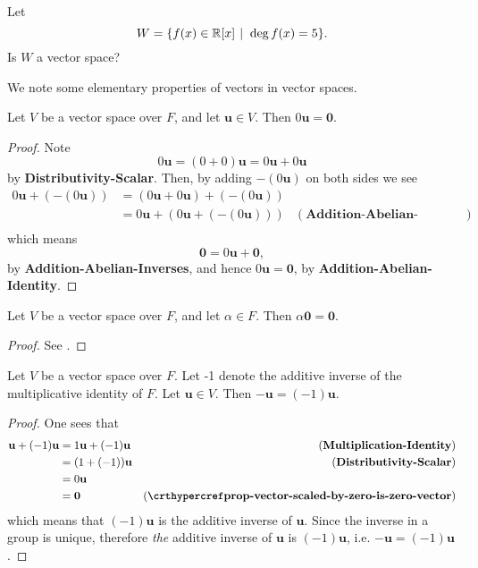\begin{exercise}
    Let
    \[
        W = \{f(x) \in \R[x] \vert \deg f(x) = 5\}.
    \]
    Is $W$ a vector space?
\end{exercise}

We note some elementary properties of vectors in vector spaces.
\begin{proposition}\label{prop-vector-scaled-by-zero-is-zero-vector}
    Let $V$ be a vector space over $F$, and let $\textbf{u} \in V$. Then $0\textbf{u} = \textbf{0}$.
\end{proposition}
\begin{proof}
    Note
    \[
        0\textbf{u} = (0 + 0)\textbf{u} = 0\textbf{u} + 0\textbf{u}
    \]
    by \textbf{Distributivity-Scalar}. Then, by adding $-(0\textbf{u})$ on both sides we see
    \begin{align*}
        0\textbf{u} + (-(0\textbf{u})) &= (0\textbf{u} + 0\textbf{u}) + (-(0\textbf{u}))\\
        &= 0\textbf{u} + (0\textbf{u} + (-(0\textbf{u}))) & (\textbf{Addition-Abelian-Associativity})\\
    \end{align*}
    which means
    \[
        \textbf{0} = 0\textbf{u} + \textbf{0},
    \]
    by \textbf{Addition-Abelian-Inverses}, and hence $0\textbf{u} = \textbf{0}$, by \textbf{Addition-Abelian-Identity}.
\end{proof}

\begin{proposition}\label{prop-zero-vector-scaled-by-constant-is-zero-vector}
    Let $V$ be a vector space over $F$, and let $\alpha \in F$. Then $\alpha\textbf{0} = \textbf{0}$.
\end{proposition}
\begin{proof}
    See .
\end{proof}

\begin{proposition}\label{prop-vector-inverse-is-negative-vector}
    Let $V$ be a vector space over $F$. Let -1 denote the additive inverse of the multiplicative identity of $F$. Let $\textbf{u} \in V$. Then $-\textbf{u} = (-1)\textbf{u}$.
\end{proposition}
\begin{proof}
    One sees that
    \begin{align*}
        \textbf{u} + (-1)\textbf{u} &= 1\textbf{u} + (-1)\textbf{u} & (\textbf{Multiplication-Identity})\\
        &= (1 + (-1))\textbf{u} & (\textbf{Distributivity-Scalar})\\
        &= 0\textbf{u}\\
        &= \textbf{0} & (\myref{prop-vector-scaled-by-zero-is-zero-vector})
    \end{align*}
    which means that $(-1)\textbf{u}$ is the additive inverse of $\textbf{u}$. Since the inverse in a group is unique, therefore \textit{the} additive inverse of $\textbf{u}$ is $(-1)\textbf{u}$, i.e. $-\textbf{u} = (-1)\textbf{u}$.
\end{proof}

